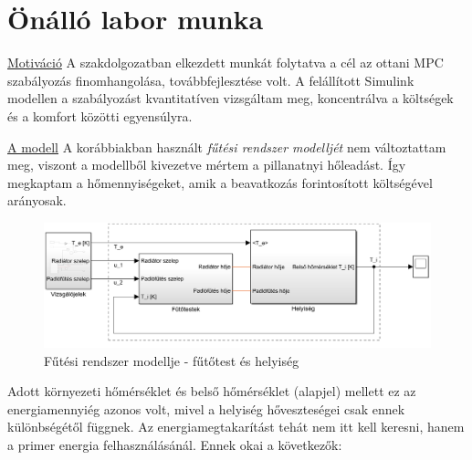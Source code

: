 

%	
%

\chapter{Önálló labor munka}



{\Large \underline{Motiváció}} \cite{Opticontrol-II}A szakdolgozatban elkezdett munkát folytatva a cél az ottani MPC szabályozás finomhangolása, továbbfejlesztése volt. 
A felállított Simulink modellen a szabályozást kvantitatíven vizsgáltam meg, koncentrálva a költségek és a komfort közötti egyensúlyra. 


{\large \underline{A modell}}
A korábbiakban használt \textit{fűtési rendszer modelljét} nem változtattam meg, viszont a modellből kivezetve mértem a pillanatnyi hőleadást. Így megkaptam a hőmennyiségeket, amik a beavatkozás forintosított költségével arányosak. 


\begin{figure}[H]
	\centering
	\includegraphics[trim=0 0 0 0, clip,width=\textwidth]{figures/simulink-network-minimalist-layout}
	\caption{Fűtési rendszer modellje - fűtőtest és helyiség}
	\label{fig:Simulink-minimalist}
\end{figure}

Adott környezeti hőmérséklet és belső hőmérséklet (alapjel) mellett ez az energiamennyiég azonos volt, mivel a helyiség hőveszteségei csak ennek különbségétől függnek. Az energiamegtakarítást tehát nem itt kell keresni, hanem a primer energia felhasználásánál. Ennek okai a következők:

